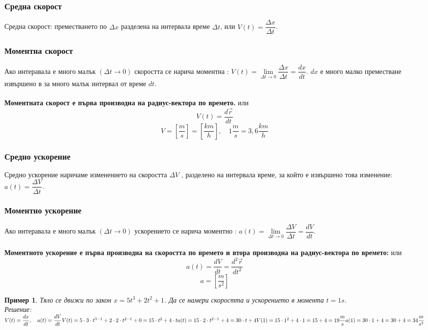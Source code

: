 \documentclass[fleqn]{article}
\newtheorem{example}{Пример}[subsection]
\begin{document}
\subsubsection{Средна скорост}
Средна скорост: преместването по $\Delta x$ разделена на интервала време $\Delta t$, или $V(t) = \dfrac{\Delta x}{\Delta t}$.

\subsubsection{Моментна скорост}
Ако интеравала е много малък $(\Delta t \rightarrow 0)$ скоростта се нарича моментна : $V(t) = \lim\limits_{\Delta t \rightarrow 0}\dfrac{\Delta x}{\Delta t} = \dfrac{dx}{dt}$. $dx$ е много малко преместване извършено в за много малък интервал от време $dt$.\\
\\
\textbf{Моментната скорост е първа производна на радиус-вектора по времето.} или 
$$V(t) = \dfrac{d \vec{r}}{dt}$$
$$V = \left[ \dfrac{m}{s}\right] = \left[ \dfrac{km}{h}\right], \quad 1\dfrac{m}{s} = 3,6 \dfrac{km}{h} $$

\subsubsection{Средно ускорение}
Средно ускорение наричаме изменението на скоростта $\Delta V$ , разделено на интервала време, за който е извършено това изменение: $a(t) =\dfrac{\Delta V}{\Delta t}$.

\subsubsection{Моментно ускорение}
Ако интеравала е много малък $(\Delta t \rightarrow 0)$ ускорението се нарича моментно : $a(t) = \lim\limits_{\Delta t \rightarrow 0}\dfrac{\Delta V}{\Delta t} = \dfrac{dV}{dt}$.\\
\\
\textbf{Моментното ускорение е първа производна на скоростта по времето и втора производна на радиус-вектора по времето: } или 
$$a(t) =  \dfrac{dV}{dt} = \dfrac{d^2 \vec{r}}{dt^2}$$
$$a = \left[ \dfrac{m}{s^2} \right]$$

\begin{example}
Тяло се движи по закон $x = 5t^3 + 2t^2 + 1$. Да се намери скоростта и ускорението в момента $t = 1s$. \\
Решение: \\
$
V(t) = \dfrac{dx}{dt}, \quad a(t) = \dfrac{dV}{dt} \\
V(t) = 5 \cdot 3 \cdot t^{3-1} + 2 \cdot 2 \cdot t^{2-1} + 0 = 15 \cdot t^2 + 4\cdot t \\
a(t) = 15\cdot 2 \cdot t^{2-1} + 4 = 30 \cdot t + 4 \\
V(1) = 15 \cdot 1^2 + 4 \cdot 1 = 15 + 4 = 19 \dfrac{m}{s} \\
a(1) = 30 \cdot 1 + 4 = 30 + 4 = 34 \dfrac{m}{s^2}
$
\end{example}
\end{document}
